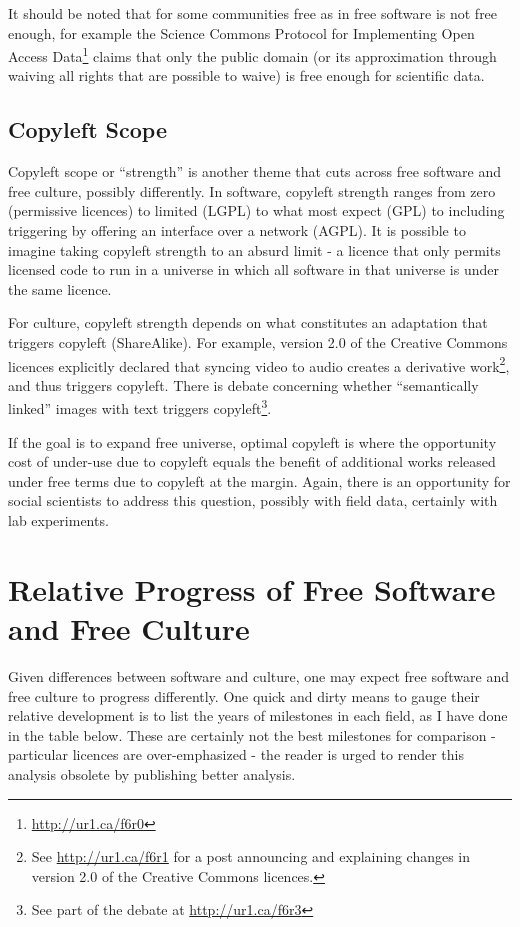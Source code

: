 It should be noted that for some communities free as in free software is not
free enough, for example the Science Commons Protocol for Implementing Open
Access Data\footnote{\url{http://ur1.ca/f6r0}} claims that only the public
domain (or its approximation through waiving all rights that are possible to
waive) is free enough for scientif\hbox{}ic data.


\subsection{Copyleft Scope}
\label{ss:free_culture_software_freedom:freedom:copyleft}

Copyleft scope or ``strength'' is another theme that cuts across free software
and free culture, possibly dif\hbox{}ferently. In software, copyleft strength
ranges from zero (permissive licences) to limited (LGPL) to what most expect
(GPL) to including triggering by of\hbox{}fering an interface over a network
(AGPL). It is possible to imagine taking copyleft strength to an absurd limit -
a licence that only permits licensed code to run in a universe in which all
software in that universe is under the same licence.

For culture, copyleft strength depends on what constitutes an adaptation that
triggers copyleft (ShareAlike). For example, version 2.0 of the Creative Commons
licences explicitly declared that syncing video to audio creates a derivative
work\footnote{See \url{http://ur1.ca/f6r1} for a post announcing and explaining
changes in version 2.0 of the Creative Commons licences.}, and thus triggers
copyleft. There is debate concerning whether ``semantically linked'' images with
text triggers copyleft\footnote{See part of the debate at
\url{http://ur1.ca/f6r3}}.

If the goal is to expand free universe, optimal copyleft is where the
opportunity cost of under-use due to copyleft equals the benef\hbox{}it of
additional works released under free terms due to copyleft at the margin. Again,
there is an opportunity for social scientists to address this question, possibly
with f\hbox{}ield data, certainly with lab experiments.


\section{Relative Progress of Free Software and Free Culture}
\label{s:free_culture_software_freedom:relative_progress}

Given dif\hbox{}ferences between software and culture, one may expect free
software and free culture to progress dif\hbox{}ferently. One quick and dirty
means to gauge their relative development is to list the years of milestones in
each f\hbox{}ield, as I have done in the table below. These are certainly not
the best milestones for comparison - particular licences are over-emphasized -
the reader is urged to render this analysis obsolete by publishing better
analysis.

